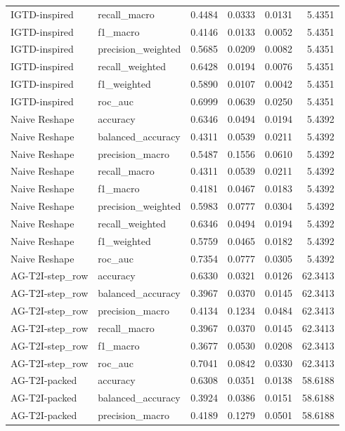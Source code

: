 \begin{tabular}{llrrrr}
IGTD-inspired & recall_macro & 0.4484 & 0.0333 & 0.0131 & 5.4351 \\
IGTD-inspired & f1_macro & 0.4146 & 0.0133 & 0.0052 & 5.4351 \\
IGTD-inspired & precision_weighted & 0.5685 & 0.0209 & 0.0082 & 5.4351 \\
IGTD-inspired & recall_weighted & 0.6428 & 0.0194 & 0.0076 & 5.4351 \\
IGTD-inspired & f1_weighted & 0.5890 & 0.0107 & 0.0042 & 5.4351 \\
IGTD-inspired & roc_auc & 0.6999 & 0.0639 & 0.0250 & 5.4351 \\
Naive Reshape & accuracy & 0.6346 & 0.0494 & 0.0194 & 5.4392 \\
Naive Reshape & balanced_accuracy & 0.4311 & 0.0539 & 0.0211 & 5.4392 \\
Naive Reshape & precision_macro & 0.5487 & 0.1556 & 0.0610 & 5.4392 \\
Naive Reshape & recall_macro & 0.4311 & 0.0539 & 0.0211 & 5.4392 \\
Naive Reshape & f1_macro & 0.4181 & 0.0467 & 0.0183 & 5.4392 \\
Naive Reshape & precision_weighted & 0.5983 & 0.0777 & 0.0304 & 5.4392 \\
Naive Reshape & recall_weighted & 0.6346 & 0.0494 & 0.0194 & 5.4392 \\
Naive Reshape & f1_weighted & 0.5759 & 0.0465 & 0.0182 & 5.4392 \\
Naive Reshape & roc_auc & 0.7354 & 0.0777 & 0.0305 & 5.4392 \\
AG-T2I-step_row & accuracy & 0.6330 & 0.0321 & 0.0126 & 62.3413 \\
AG-T2I-step_row & balanced_accuracy & 0.3967 & 0.0370 & 0.0145 & 62.3413 \\
AG-T2I-step_row & precision_macro & 0.4134 & 0.1234 & 0.0484 & 62.3413 \\
AG-T2I-step_row & recall_macro & 0.3967 & 0.0370 & 0.0145 & 62.3413 \\
AG-T2I-step_row & f1_macro & 0.3677 & 0.0530 & 0.0208 & 62.3413 \\
AG-T2I-step_row & roc_auc & 0.7041 & 0.0842 & 0.0330 & 62.3413 \\
AG-T2I-packed & accuracy & 0.6308 & 0.0351 & 0.0138 & 58.6188 \\
AG-T2I-packed & balanced_accuracy & 0.3924 & 0.0386 & 0.0151 & 58.6188 \\
AG-T2I-packed & precision_macro & 0.4189 & 0.1279 & 0.0501 & 58.6188 \\

\end{tabular}
